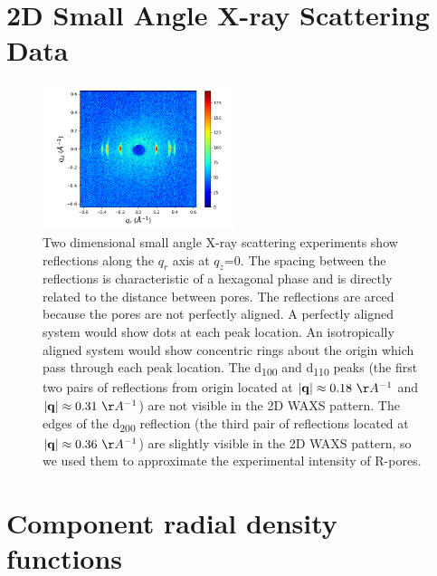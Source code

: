 \documentclass{article}
\begin{document}
  \section{2D Small Angle X-ray Scattering Data}  
  
  \begin{figure}[!htb]
  \centering
  \includegraphics[width=0.5\textwidth]{2DSAXS_axes.png}
  \caption{Two dimensional small angle X-ray scattering experiments show
  reflections along the $q_r$ axis at $q_z$=0. The spacing between the reflections
  is characteristic of a hexagonal phase and is directly related to the distance
  between pores. The reflections are arced because the pores are not perfectly
  aligned. A perfectly aligned system would show dots at each peak location. An
  isotropically aligned system would show concentric rings about the origin which
  pass through each peak location. The d\textsubscript{100} and d\textsubscript{110} 
  peaks (the first two pairs of reflections from origin located at $|\mathbf{q}| 
  \approx 0.18~\AA^{-1}$ and $|\mathbf{q}| \approx 0.31~\AA^{-1}$) are not visible
  in the 2D WAXS pattern. The edges of the d\textsubscript{200} reflection (the third
  pair of reflections located at $|\mathbf{q}| \approx 0.36~\AA^{-1}$) are slightly
  visible in the 2D WAXS pattern, so we used them to approximate the experimental
  intensity of R-pores.}\label{fig:2DSAXS}
  \end{figure}

  \newpage

  \section{Component radial density functions}\label{section:radial_density}
  
\end{document}
